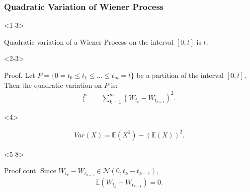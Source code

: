 \documentclass[10pt]{beamer}
\begin{document}
\begin{frame}[t]
  \frametitle{Quadratic Variation of Wiener Process}
    \begin{onlyenv}<1-3>
    \begin{theorem}
      Quadratic variation of a Wiener Process on the interval $[0,t]$ is $t$.
    \end{theorem}
    \end{onlyenv}
    \begin{onlyenv}<2-3>
      \begin{block}{Proof.}
        Let $P = \{0 = t_0 \leq t_1 \leq \dots \leq t_m = t\}$ be a partition of the interval $[0,t]$. Then the quadratic variation on $P$ is:
        \begin{align*}
          [W]^{P}_{t} &= \displaystyle\sum_{k = 1}^{m}(W_{t_k} - W_{t_{k-1}})^2 .
        \end{align*}
      \end{block}
    \end{onlyenv}
    \begin{onlyenv}<4>
        \begin{theorem}
          \begin{align*}
            Var(X) = \mathbb{E}(X^2) - (\mathbb{E}(X))^2.
          \end{align*}
        \end{theorem}
    \end{onlyenv}
    \begin{onlyenv}<5-8>
      \begin{block}{Proof cont.}
        Since $W_{t_{k}} - W_{t_{k-1}} \in \mathcal{N}(0, t_{k} - t_{k-1})$, 
        \begin{align*}
          \mathbb{E}(W_{t_{k}} - W_{t_{k-1}}) = 0.
        \end{align*}
\end{block}
\end{onlyenv}
\end{frame}
\end{document}
